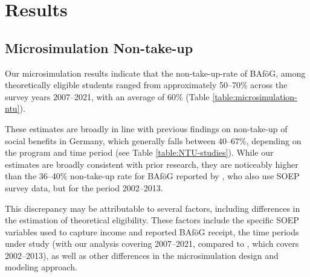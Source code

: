 \section{Results}

\subsection{Microsimulation Non-take-up}
Our microsimulation results indicate that the non-take-up-rate of BAföG, among theoretically eligible students ranged from approximately 50--70\% across the survey years 2007--2021, with an average of 60\%  (Table \ref{table:microsimulation-ntu}).

These estimates are broadly in line with previous findings on non-take-up of social benefits in Germany, which generally falls between 40--67\%, depending on the program and time period (see Table \ref{table:NTU-studies}). 
While our estimates are broadly consistent with prior research, they are noticeably higher than the 36--40\% non-take-up rate for BAföG reported by \cite{herber_non-take-up_2019}, who also use SOEP survey data, but for the period 2002--2013.

This discrepancy may be attributable to several factors, including differences in the estimation of theoretical eligibility. These factors include the specific SOEP variables used to capture income and reported BAföG receipt, the time periods under study (with our analysis covering 2007--2021, compared to \cite{herber_non-take-up_2019}, which covers 2002--2013), as well as other differences in the microsimulation design and modeling approach.


